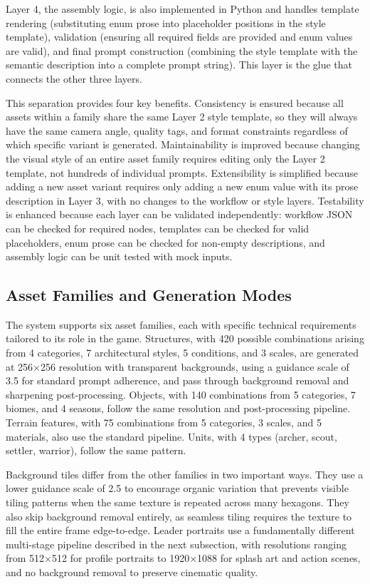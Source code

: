 \documentclass[conference]{IEEEtran}
\begin{document}
Layer 4, the assembly logic, is also implemented in Python and handles template rendering (substituting enum prose into placeholder positions in the style template), validation (ensuring all required fields are provided and enum values are valid), and final prompt construction (combining the style template with the semantic description into a complete prompt string). This layer is the glue that connects the other three layers.

This separation provides four key benefits. Consistency is ensured because all assets within a family share the same Layer 2 style template, so they will always have the same camera angle, quality tags, and format constraints regardless of which specific variant is generated. Maintainability is improved because changing the visual style of an entire asset family requires editing only the Layer 2 template, not hundreds of individual prompts. Extensibility is simplified because adding a new asset variant requires only adding a new enum value with its prose description in Layer 3, with no changes to the workflow or style layers. Testability is enhanced because each layer can be validated independently: workflow JSON can be checked for required nodes, templates can be checked for valid placeholders, enum prose can be checked for non-empty descriptions, and assembly logic can be unit tested with mock inputs.

\subsection{Asset Families and Generation Modes}

The system supports six asset families, each with specific technical requirements tailored to its role in the game. Structures, with 420 possible combinations arising from 4 categories, 7 architectural styles, 5 conditions, and 3 scales, are generated at 256$\times$256 resolution with transparent backgrounds, using a guidance scale of 3.5 for standard prompt adherence, and pass through background removal and sharpening post-processing. Objects, with 140 combinations from 5 categories, 7 biomes, and 4 seasons, follow the same resolution and post-processing pipeline. Terrain features, with 75 combinations from 5 categories, 3 scales, and 5 materials, also use the standard pipeline. Units, with 4 types (archer, scout, settler, warrior), follow the same pattern.

Background tiles differ from the other families in two important ways. They use a lower guidance scale of 2.5 to encourage organic variation that prevents visible tiling patterns when the same texture is repeated across many hexagons. They also skip background removal entirely, as seamless tiling requires the texture to fill the entire frame edge-to-edge. Leader portraits use a fundamentally different multi-stage pipeline described in the next subsection, with resolutions ranging from 512$\times$512 for profile portraits to 1920$\times$1088 for splash art and action scenes, and no background removal to preserve cinematic quality.
\end{document}
